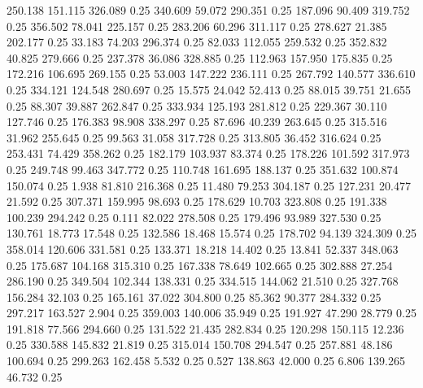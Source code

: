  250.138  151.115  326.089         0.25
 340.609   59.072  290.351         0.25
 187.096   90.409  319.752         0.25
 356.502   78.041  225.157         0.25
 283.206   60.296  311.117         0.25
 278.627   21.385  202.177         0.25
  33.183   74.203  296.374         0.25
  82.033  112.055  259.532         0.25
 352.832   40.825  279.666         0.25
 237.378   36.086  328.885         0.25
 112.963  157.950  175.835         0.25
 172.216  106.695  269.155         0.25
  53.003  147.222  236.111         0.25
 267.792  140.577  336.610         0.25
 334.121  124.548  280.697         0.25
  15.575   24.042   52.413         0.25
  88.015   39.751   21.655         0.25
  88.307   39.887  262.847         0.25
 333.934  125.193  281.812         0.25
 229.367   30.110  127.746         0.25
 176.383   98.908  338.297         0.25
  87.696   40.239  263.645         0.25
 315.516   31.962  255.645         0.25
  99.563   31.058  317.728         0.25
 313.805   36.452  316.624         0.25
 253.431   74.429  358.262         0.25
 182.179  103.937   83.374         0.25
 178.226  101.592  317.973         0.25
 249.748   99.463  347.772         0.25
 110.748  161.695  188.137         0.25
 351.632  100.874  150.074         0.25
   1.938   81.810  216.368         0.25
  11.480   79.253  304.187         0.25
 127.231   20.477   21.592         0.25
 307.371  159.995   98.693         0.25
 178.629   10.703  323.808         0.25
 191.338  100.239  294.242         0.25
   0.111   82.022  278.508         0.25
 179.496   93.989  327.530         0.25
 130.761   18.773   17.548         0.25
 132.586   18.468   15.574         0.25
 178.702   94.139  324.309         0.25
 358.014  120.606  331.581         0.25
 133.371   18.218   14.402         0.25
  13.841   52.337  348.063         0.25
 175.687  104.168  315.310         0.25
 167.338   78.649  102.665         0.25
 302.888   27.254  286.190         0.25
 349.504  102.344  138.331         0.25
 334.515  144.062   21.510         0.25
 327.768  156.284   32.103         0.25
 165.161   37.022  304.800         0.25
  85.362   90.377  284.332         0.25
 297.217  163.527    2.904         0.25
 359.003  140.006   35.949         0.25
 191.927   47.290   28.779         0.25
 191.818   77.566  294.660         0.25
 131.522   21.435  282.834         0.25
 120.298  150.115   12.236         0.25
 330.588  145.832   21.819         0.25
 315.014  150.708  294.547         0.25
 257.881   48.186  100.694         0.25
 299.263  162.458    5.532         0.25
   0.527  138.863   42.000         0.25
   6.806  139.265   46.732         0.25
